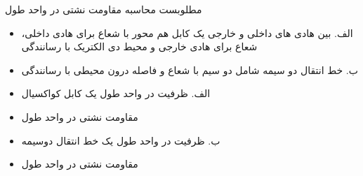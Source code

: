 \begin{ELexample}{}

مطلوبست محاسبه مقاومت نشتی در واحد طول

\begin{itemize}
\tightlist
\item
  الف. بین هادی های داخلی و خارجی یک کابل هم محور با شعاع  برای هادی داخلی، شعاع  برای هادی خارجی و محیط دی الکتریک با رسانندگی \ELim{\sigma}
\item
  ب. خط انتقال دو سیمه شامل دو سیم با شعاع  و فاصله  درون محیطی با رسانندگی \ELim{\sigma}
\end{itemize}

\begin{ELsolution}

\begin{itemize}
\tightlist
\item
  الف. ظرفیت در واحد طول یک کابل کواکسیال
\end{itemize}


\begin{itemize}
\tightlist
\item
  مقاومت نشتی در واحد طول
\end{itemize}


\begin{itemize}
\tightlist
\item
  ب. ظرفیت در واحد طول یک خط انتقال دوسیمه
\end{itemize}


\begin{itemize}
\tightlist
\item
  مقاومت نشتی در واحد طول
\end{itemize}


\end{ELsolution}

\end{ELexample}

